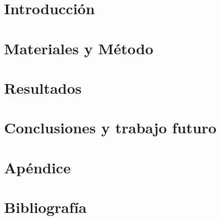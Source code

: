 \documentclass[11pt,a4paper]{tesis}
\begin{document}
\def\titulo{Licenciatura\xspace}

\def\autor{Damián Eliel Aleman}
\def\tituloTesis{Titulo de Tesis}
\def\runtitulo{\tituloTesis}
\def\director{Agustín Gravano}
\def\codirector{Juan Manuel Perez}
\def\lugar{Buenos Aires, 2017}
%



\frontmatter
\pagestyle{empty}




\tableofcontents

\mainmatter
\pagestyle{headings}


\chapter{Introducción}


\chapter{Materiales y Método}


\chapter{Resultados}


\chapter{Conclusiones y trabajo futuro}


\chapter{Apéndice}



\chapter{Bibliografía}
\backmatter



\end{document}
